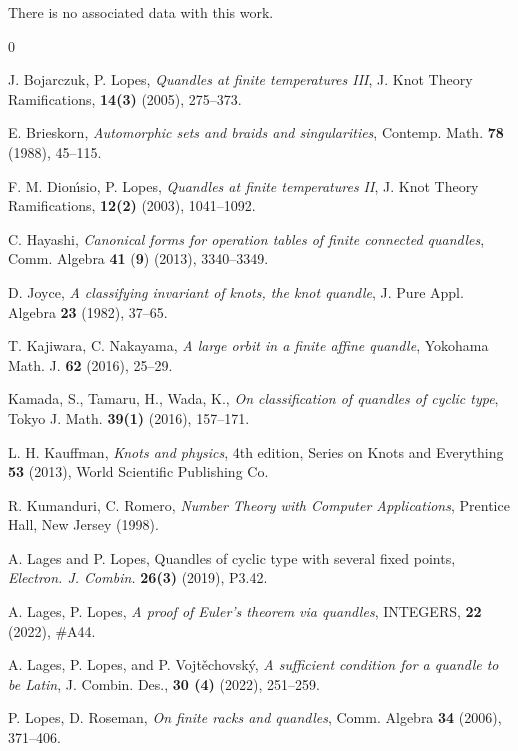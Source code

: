 \documentclass{article}
\begin{document}
There is no associated data with this work.




\begin{thebibliography}{0}

    J. Bojarczuk, P. Lopes, \emph{Quandles at finite temperatures III}, J. Knot Theory Ramifications, {\bf14(3)} (2005), 275--373.

    E. Brieskorn, \emph{Automorphic sets and braids and singularities}, Contemp. Math. {\bf78} (1988), 45--115.

    F. M. Dion\'\i sio, P. Lopes, \emph{Quandles at finite temperatures II}, J. Knot Theory Ramifications, {\bf12(2)} (2003), 1041--1092.

    C. Hayashi, \emph{Canonical forms for operation tables of finite connected quandles}, Comm. Algebra \textbf{41} (\textbf{9}) (2013), 3340--3349.

    D. Joyce, \emph{A classifying invariant of knots, the knot quandle}, J. Pure Appl. Algebra {\bf23} (1982), 37--65.

    T. Kajiwara, C. Nakayama, \emph{A large orbit in a finite affine quandle}, Yokohama Math. J. {\bf62} (2016), 25--29.


    Kamada, S., Tamaru, H., Wada, K., \emph{On classification of quandles of cyclic type}, Tokyo J. Math. {\bf39(1)} (2016), 157--171.


    L. H. Kauffman, \emph{Knots and physics}, 4th edition, Series on Knots and Everything {\bf53} (2013), World Scientific Publishing Co.

    R. Kumanduri, C. Romero, \emph{Number Theory with Computer Applications}, Prentice Hall, New Jersey (1998).

    A. Lages and P. Lopes, Quandles of cyclic type with several fixed points, {\it Electron. J. Combin.} {\bf26(3)} (2019), P3.42.

    A. Lages, P. Lopes, \emph{A proof of Euler's theorem via quandles}, INTEGERS, {\bf22} (2022), \#A44.


    A. Lages, P. Lopes, and P. Vojt\v{e}chovsk\'y, \emph{A sufficient condition for a quandle to be Latin}, J. Combin. Des., {\bf30 (4)} (2022), 251--259.

    P. Lopes, D. Roseman, \emph{On finite racks and quandles}, Comm. Algebra {\bf34} (2006), 371--406.


\end{thebibliography}
\end{document}
